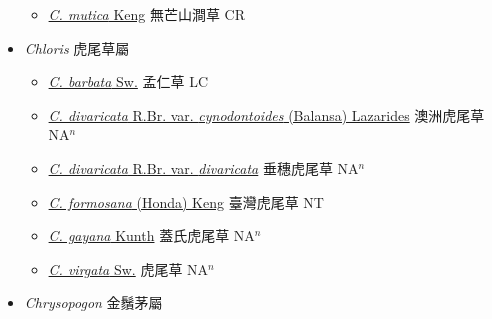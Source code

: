 \begin{itemize}
  \begin{itemize}
        \item[] \href{http://www.theplantlist.org/tpl1.1/search?q=Chikusichloa+mutica}{\textit{C. mutica} Keng}   無芒山澗草 CR
  \end{itemize}
 \item[] \textit{Chloris} 虎尾草屬
                    
  \begin{itemize}
        \item[] \href{http://www.theplantlist.org/tpl1.1/search?q=Chloris+barbata}{\textit{C. barbata} Sw.}   孟仁草 LC
        \item[] \href{http://www.theplantlist.org/tpl1.1/search?q=Chloris+divaricata+var.+cynodontoides}{\textit{C. divaricata} R.Br. var. \textit{cynodontoides} (Balansa) Lazarides}   澳洲虎尾草 NA$^n$
        \item[] \href{http://www.theplantlist.org/tpl1.1/search?q=Chloris+divaricata+var.+divaricata}{\textit{C. divaricata} R.Br. var. \textit{divaricata}}   垂穗虎尾草 NA$^n$
        \item[] \href{http://www.theplantlist.org/tpl1.1/search?q=Chloris+formosana}{\textit{C. formosana} (Honda) Keng}   臺灣虎尾草 NT
        \item[] \href{http://www.theplantlist.org/tpl1.1/search?q=Chloris+gayana}{\textit{C. gayana} Kunth}   蓋氏虎尾草 NA$^n$
        \item[] \href{http://www.theplantlist.org/tpl1.1/search?q=Chloris+virgata}{\textit{C. virgata} Sw.}   虎尾草 NA$^n$
  \end{itemize}
 \item[] \textit{Chrysopogon} 金鬚茅屬
                    

\end{itemize}
